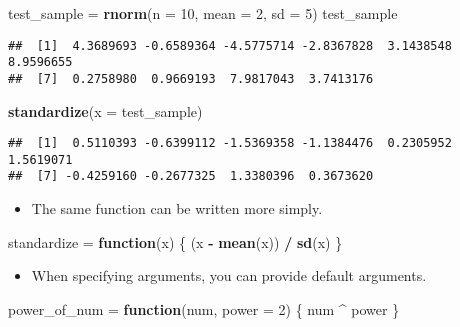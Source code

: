 \documentclass[]{book}
\newenvironment{Shaded}{\begin{snugshade}}{\end{snugshade}}
\newcommand{\KeywordTok}[1]{\textcolor[rgb]{0.13,0.29,0.53}{\textbf{#1}}}
\newcommand{\DataTypeTok}[1]{\textcolor[rgb]{0.13,0.29,0.53}{#1}}
\newcommand{\DecValTok}[1]{\textcolor[rgb]{0.00,0.00,0.81}{#1}}
\newcommand{\StringTok}[1]{\textcolor[rgb]{0.31,0.60,0.02}{#1}}
\newcommand{\ControlFlowTok}[1]{\textcolor[rgb]{0.13,0.29,0.53}{\textbf{#1}}}
\newcommand{\OperatorTok}[1]{\textcolor[rgb]{0.81,0.36,0.00}{\textbf{#1}}}
\newcommand{\NormalTok}[1]{#1}
\providecommand{\tightlist}{%
  \setlength{\itemsep}{0pt}\setlength{\parskip}{0pt}}
\begin{document}
\begin{Shaded}
\begin{Highlighting}[]
\NormalTok{test_sample =}\StringTok{ }\KeywordTok{rnorm}\NormalTok{(}\DataTypeTok{n =} \DecValTok{10}\NormalTok{, }\DataTypeTok{mean =} \DecValTok{2}\NormalTok{, }\DataTypeTok{sd =} \DecValTok{5}\NormalTok{)}
\NormalTok{test_sample}
\end{Highlighting}
\end{Shaded}

\begin{verbatim}
##  [1]  4.3689693 -0.6589364 -4.5775714 -2.8367828  3.1438548  8.9596655
##  [7]  0.2758980  0.9669193  7.9817043  3.7413176
\end{verbatim}

\begin{Shaded}
\begin{Highlighting}[]
\KeywordTok{standardize}\NormalTok{(}\DataTypeTok{x =}\NormalTok{ test_sample)}
\end{Highlighting}
\end{Shaded}

\begin{verbatim}
##  [1]  0.5110393 -0.6399112 -1.5369358 -1.1384476  0.2305952  1.5619071
##  [7] -0.4259160 -0.2677325  1.3380396  0.3673620
\end{verbatim}

\begin{itemize}
\tightlist
\item
  The same function can be written more simply.
\end{itemize}

\begin{Shaded}
\begin{Highlighting}[]
\NormalTok{standardize =}\StringTok{ }\ControlFlowTok{function}\NormalTok{(x) \{}
\NormalTok{  (x }\OperatorTok{-}\StringTok{ }\KeywordTok{mean}\NormalTok{(x)) }\OperatorTok{/}\StringTok{ }\KeywordTok{sd}\NormalTok{(x)}
\NormalTok{\}}
\end{Highlighting}
\end{Shaded}

\begin{itemize}
\tightlist
\item
  When specifying arguments, you can provide default arguments.
\end{itemize}

\begin{Shaded}
\begin{Highlighting}[]
\NormalTok{power_of_num =}\StringTok{ }\ControlFlowTok{function}\NormalTok{(num, }\DataTypeTok{power =} \DecValTok{2}\NormalTok{) \{}
\NormalTok{  num }\OperatorTok{^}\StringTok{ }\NormalTok{power}
\NormalTok{\}}
\end{Highlighting}
\end{Shaded}
\end{document}
